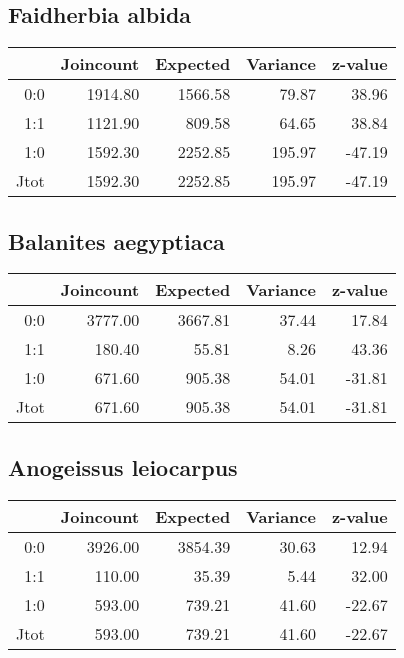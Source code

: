 \documentclass[a4paper, oneside, 12pt]{book}
\begin{document}
\subsection{Faidherbia albida}
\begin{table}[H]
	\centering
	\begin{tabular}{rrrrr}
		\hline
		& Joincount & Expected & Variance & z-value \\ 
		\hline
		0:0 & 1914.80 & 1566.58 & 79.87 & 38.96 \\ 
		1:1 & 1121.90 & 809.58 & 64.65 & 38.84 \\ 
		1:0 & 1592.30 & 2252.85 & 195.97 & -47.19 \\ 
		Jtot & 1592.30 & 2252.85 & 195.97 & -47.19 \\ 
		\hline
	\end{tabular}
\end{table}
\subsection{Balanites aegyptiaca}
\begin{table}[H]
	\centering
	\begin{tabular}{rrrrr}
		\hline
		& Joincount & Expected & Variance & z-value \\ 
		\hline
		0:0 & 3777.00 & 3667.81 & 37.44 & 17.84 \\ 
		1:1 & 180.40 & 55.81 & 8.26 & 43.36 \\ 
		1:0 & 671.60 & 905.38 & 54.01 & -31.81 \\ 
		Jtot & 671.60 & 905.38 & 54.01 & -31.81 \\ 
		\hline
	\end{tabular}
\end{table}
\subsection{Anogeissus leiocarpus}
\begin{table}[H]
	\centering
	\begin{tabular}{rrrrr}
		\hline
		& Joincount & Expected & Variance & z-value \\ 
		\hline
		0:0 & 3926.00 & 3854.39 & 30.63 & 12.94 \\ 
		1:1 & 110.00 & 35.39 & 5.44 & 32.00 \\ 
		1:0 & 593.00 & 739.21 & 41.60 & -22.67 \\ 
		Jtot & 593.00 & 739.21 & 41.60 & -22.67 \\ 
		\hline
	\end{tabular}
\end{table}
\end{document}
